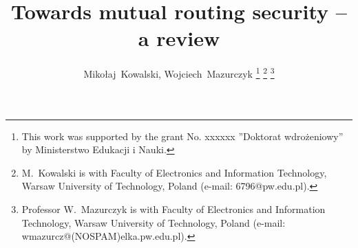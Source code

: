 \documentclass[journal,a4paper,twoside]{IEEEtran}
\begin{document}
%

\title{\vspace{1cm} Towards mutual routing security -- a review}
%
%
%

\author{Mikołaj~Kowalski, Wojciech~Mazurczyk%
	\thanks{This work was supported by the grant No. xxxxxx ”Doktorat wdrożeniowy” by Ministerstwo Edukacji i Nauki.}%
	\thanks{M.~Kowalski is with Faculty of Electronics and Information Technology, Warsaw University of Technology, Poland (e-mail: 6796@pw.edu.pl).}%
	\thanks{Professor W.~Mazurczyk is with Faculty of Electronics and Information Technology, Warsaw University of Technology, Poland (e-mail:  wmazurcz@(NOSPAM)elka.pw.edu.pl).}%
}


%
%
\end{document}
